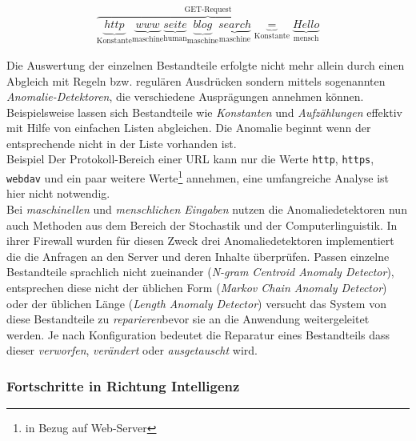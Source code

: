 \begin{align}
  \overbrace{
    \underbrace{http}_\text{Konstante} \underbrace{www}_\text{maschine}\underbrace{seite}_\text{human}\underbrace{blog}_\text{maschine}\underbrace{search}_\text{maschine}\underbrace{=}_\text{Konstante}\underbrace{Hello}_\text{mensch}
  }^\text{GET-Request}
\end{align}

Die Auswertung der einzelnen Bestandteile erfolgte nicht mehr allein durch einen Abgleich mit Regeln bzw. regulären Ausdrücken sondern mittels sogenannten \emph{Anomalie-Detektoren}, die verschiedene Ausprägungen annehmen können. Beispielsweise lassen sich Bestandteile wie \emph{Konstanten} und \emph{Aufzählungen} effektiv mit Hilfe von einfachen Listen abgleichen. Die Anomalie beginnt wenn der entsprechende nicht in der Liste vorhanden ist.\\

\textcolor{bhtGray}{ Beispiel} Der Protokoll-Bereich einer URL kann nur die Werte \verb=http=, \verb=https=, \verb=webdav= und ein paar weitere Werte\footnote{in Bezug auf Web-Server} annehmen, eine umfangreiche Analyse ist hier nicht notwendig. \\

Bei \emph{maschinellen} und \emph{menschlichen Eingaben} nutzen die Anomaliedetektoren nun auch Methoden aus dem Bereich der Stochastik und der Computerlinguistik. In ihrer Firewall wurden für diesen Zweck drei Anomaliedetektoren implementiert die die Anfragen an den Server und deren Inhalte überprüfen. Passen einzelne Bestandteile sprachlich nicht zueinander (\emph{N-gram Centroid Anomaly Detector}), entsprechen diese nicht der üblichen Form (\emph{Markov Chain Anomaly Detector}) oder der üblichen Länge (\emph{Length Anomaly Detector}) versucht das System von \cite{Krueger2010} diese Bestandteile zu \glqq\emph{reparieren}\grqq bevor sie an die Anwendung weitergeleitet werden. Je nach Konfiguration bedeutet die Reparatur eines Bestandteils dass dieser \emph{verworfen}, \emph{verändert} oder \emph{ausgetauscht} wird. 






\subsubsection{Fortschritte in Richtung Intelligenz}

